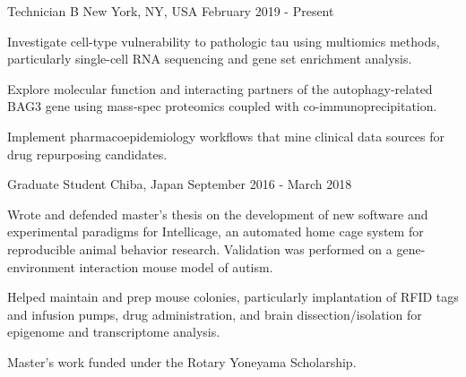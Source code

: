 %
%
%

\vspace*{0.35cm}

\begin{cventries}

    {Technician B}
    {New York, NY, USA}
    {February 2019 - Present}
    {\begin{cvitems}
        \item{Investigate cell-type vulnerability to pathologic tau using multiomics
            methods, particularly single-cell RNA sequencing and gene set enrichment
            analysis.\vspace*{0.1cm}}
        \item{Explore molecular function and interacting partners of the
            autophagy-related BAG3 gene using mass-spec proteomics coupled with
            co-immunoprecipitation.\vspace*{0.1cm}}
        \item{Implement pharmacoepidemiology workflows that mine clinical data sources
            for drug repurposing candidates.}
    \end{cvitems}}
    \vspace*{0.2cm}

    {Graduate Student}
    {Chiba, Japan}
    {September 2016 - March 2018}
    {\begin{cvitems}
        \item{Wrote and defended master's thesis on the development of new software and
            experimental paradigms for Intellicage, an automated home cage system for
            reproducible animal behavior research. Validation was performed on a
            gene-environment interaction mouse model of autism.\vspace*{0.1cm}}
        \item{Helped maintain and prep mouse colonies, particularly implantation of RFID
            tags and infusion pumps, drug administration, and brain dissection/isolation
            for epigenome and transcriptome analysis.\vspace*{0.1cm}}
        \item{Master's work funded under the Rotary Yoneyama Scholarship.}
    \end{cvitems}}
    \vspace*{0.2cm}
    

\end{cventries}
